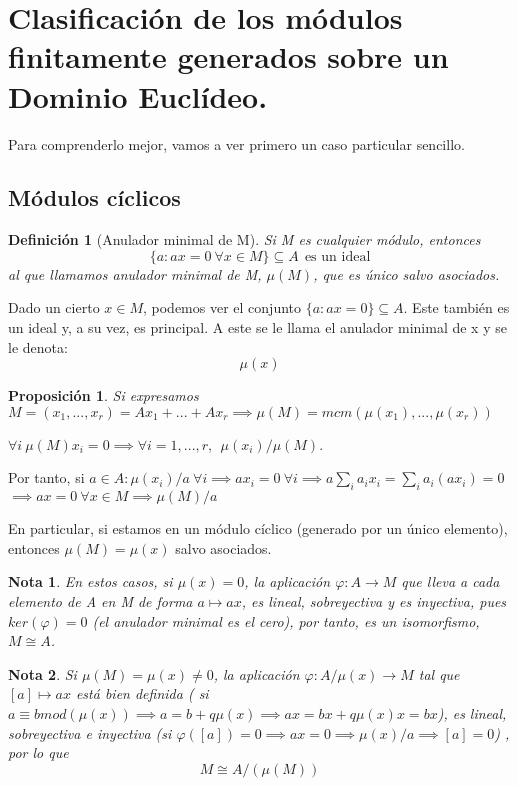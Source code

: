 \documentclass[11pt, a4paper, titlepage]{article}
\makeatletter
\renewenvironment{proof}[1][\proofname] {\vspace{-15pt}\par\pushQED{\qed}\normalfont\topsep6\p@\@plus6\p@\relax\trivlist\item[\hskip\labelsep\it#1\@addpunct{.}]\ignorespaces}{\popQED\endtrivlist\@endpefalse}
\theoremstyle{theorem-style}
\newtheorem*{nprop}{Proposición}
\theoremstyle{definition-style}
\newtheorem*{ndef}{Definición}
\theoremstyle{remark-style}
\newtheorem*{nota}{Nota}
\theoremstyle{example-style}
\makeatother
\begin{document}
\section{Clasificación de los módulos finitamente generados sobre un Dominio Euclídeo.}

Para comprenderlo mejor, vamos a ver primero un caso particular sencillo.
\subsection{Módulos cíclicos}
\begin{ndef}[Anulador minimal de M]
	Si M es cualquier módulo, entonces
	\[
	\{a: ax = 0 \ \forall x \in M\}\subseteq A \ \  \text{es un ideal}
	\]
	al que llamamos anulador minimal de M, $\mu(M)$, que es único salvo asociados.
\end{ndef}

Dado un cierto $x\in M$, podemos ver el conjunto $\{a : ax = 0\} \subseteq A$. Este también es un ideal y, a su vez, es principal. A este se le llama el anulador minimal de x y se le denota:
\[
\mu(x)
\]

\begin{nprop}
	Si expresamos $M= (x_1,...,x_r) = Ax_1 + ...+ Ax_r \implies \mu(M) = mcm(\mu(x_1),...,\mu(x_r))$
\end{nprop}
\begin{proof}
	$\forall i \ \mu(M)x_i = 0 \implies \forall i=1,...,r, \ \ \mu(x_i) / \mu(M)$.
	
	Por tanto, si $a\in A: \mu(x_i)/a \ \forall i \implies ax_i = 0 \ \forall i \implies a\sum_i a_ix_i = \sum_i a_i(ax_i) = 0$
	$\implies ax = 0 \ \forall x \in M \implies \mu(M) / a$
\end{proof}

En particular, si estamos en un módulo cíclico (generado por un único elemento), entonces $\mu(M) = \mu(x)$ salvo asociados.

\begin{nota}
	En estos casos, si $\mu(x) = 0$, la aplicación $\varphi: A \to M$ que lleva a cada elemento de A en M de forma $a \mapsto ax$, es lineal, sobreyectiva y es inyectiva, pues $ker(\varphi) = 0$ (el anulador minimal es el cero), por tanto, es un isomorfismo, $M \cong A$.
\end{nota}

\begin{nota}
	Si $\mu(M) = \mu(x) \ne 0$, la aplicación $\varphi :A/\mu(x) \to M$ tal que $[a]\mapsto ax$ está bien definida ( si $a \equiv b mod(\mu(x)) \implies a = b+q\mu(x) \implies ax = bx +q\mu(x)x = bx$), es lineal, sobreyectiva e inyectiva (si $\varphi([a]) = 0 \implies ax = 0 \implies  \mu(x)/a \implies [a] = 0$) , por lo que
	\[
	M  \cong A/(\mu(M))
	\]
\end{nota}
\end{document}
